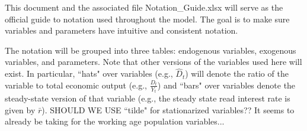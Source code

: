\documentclass[letterpaper,12pt]{article}
\theoremstyle{definition}
\begin{document}
This document and the associated file Notation\_Guide.xlsx will serve as the official guide to notation used throughout the model.  The goal is to make sure variables and parameters have intuitive and consistent notation.

The notation will be grouped into three tables: endogenous variables, exogenous variables, and parameters.  Note that other versions of the variables used here will exist.  In particular, ``hats" over variables (e.g., $\hat{D}_{t}$) will denote the ratio of the variable to total economic output (e.g., $\frac{D_{t}}{Y_{t}}$) and ``bars" over variables denote the steady-state version of that variable (e.g., the steady state read interest rate is given by $\bar{r}$).  SHOULD WE USE ``tilde" for stationarized variables??  It seems to already be taking for the working age population variables...
\end{document}
